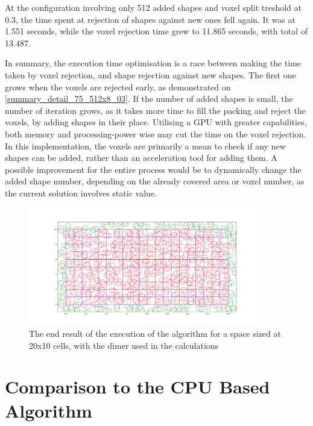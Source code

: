 \documentclass[12pt, oneside]{report}
\begin{document}
At the configuration involving only 512 added shapes and voxel split treshold at 0.3, the time spent at rejection of shapes against new ones fell again. It was at 1.551 seconds, while the voxel rejection time grew to 11.865 seconds, with total of 13.487. \newline

In summary, the execution time optimisation is a race between making the time taken by voxel rejection, and shape rejection against new shapes. The first one grows when the voxels are rejected early, as demonstrated on \ref{summary_detail_75_512x8_03}. If the number of added shapes is small, the number of iteration grows, as it takes more time to fill the packing and reject the voxels, by adding shapes in their place. Utilising a GPU with greater capabilities, both memory and processing-power wise may cut the time on the voxel rejection. \newline
In this implementation, the voxels are primarily a mean to check if any new shapes can be added, rather than an acceleration tool for adding them. A possible improvement for the entire process would be to dynamically change the added shape number, depending on the already covered area or voxel number, as the current solution involves static value.

\begin{figure}[H]
  \centering
	\includegraphics[width=0.9\textwidth,keepaspectratio]{Images/SummaryOptimisation/dimer_ready.pdf}
	\caption{The end result of the execution of the algorithm for a space sized at 20x10 cells, with the dimer used in the calculations}
	\label{summary_dimer_ready}
\end{figure}

\section{Comparison to the CPU Based Algorithm}
\end{document}
